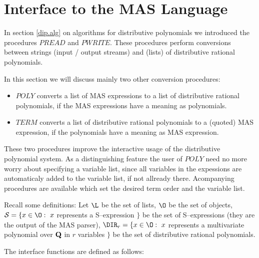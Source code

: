 


\section{Interface to the MAS Language} %

In section \ref{dip.alg} on algorithms 
for distributive polynomials we introduced 
the procedures $PREAD$ and $PWRITE$.
These procedures perform conversions between 
strings (input / output streams) and 
(lists) of distributive rational polynomials.

In this section we will discuss mainly two other   
conversion procedures:
\begin{itemize}
\item $POLY$ converts a list of MAS expressions 
      to a list of distributive rational polynomials, 
      if the MAS expressions have a meaning as polynomials.
\item $TERM$ converts a list of distributive 
      rational polynomials to a (quoted) MAS expression,
      if the polynomials have a meaning as MAS expression. 
\end{itemize}

These two procedures improve the interactive usage 
of the distributive polynomial system. 
As a distinguishing feature the user of $POLY$ need 
no more worry about specifying a variable list,
since all variables in the expessions are automaticaly  
added to the variable list, if not allready there.
Acompanying procedures are available which  
set the desired term order and the variable list.


\def\S{\mbox{$\cal S$}}
Recall some definitions: 
Let $\L$ be the set of lists,
$\O$ be the set of objects,
$\S = \{ x \in \O: \ x$ represents a S--expression $\}$ 
be the set of S--expressions (they are the output of the MAS parser),
$\DIR_r = \{ x \in \O: \ x$ represents a multivariate polynomial over
           ${\rm \bf Q}$ in $r$ variables $\}$ 
be the set of distributive rational polynomials. 


The interface functions are defined as follows:

